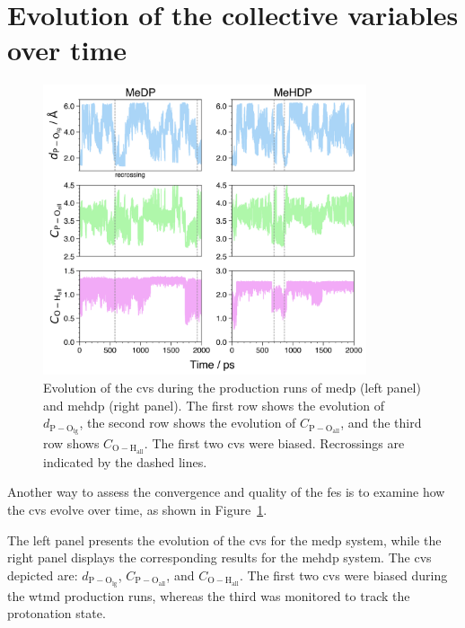 \section{Evolution of the collective variables over time}

\begin{figure}[t!]
    \centering
    \includegraphics[width=0.85\textwidth]{Figures/4_Results/results_300K_cv_evolution.png}
    \caption{Evolution of the \acp{cv} during the production runs of \ac{medp} (left panel) and \ac{mehdp} (right panel). The first row shows the evolution of $d_\mathrm{P-O_{\mathrm{lg}}}$, the second row shows the evolution of $C_\mathrm{P-O_{\mathrm{all}}}$, and the third row shows $C_\mathrm{O-H_{\mathrm{all}}}$. The first two \acp{cv} were biased. Recrossings are indicated by the dashed lines.}
    \label{fig:300k_cv_evolution}
\end{figure}

Another way to assess the convergence and quality of the \ac{fes} is to examine how the \acp{cv} evolve over time, as shown in Figure~\ref{fig:300k_cv_evolution}.

The left panel presents the evolution of the \acp{cv} for the \ac{medp} system, while the right panel displays the corresponding results for the \ac{mehdp} system. The \acp{cv} depicted are: $d_\mathrm{P-O_{\mathrm{lg}}}$, $C_\mathrm{P-O_{\mathrm{all}}}$, and $C_\mathrm{O-H_{\mathrm{all}}}$. The first two \acp{cv} were biased during the \ac{wtmd} production runs, whereas the third was monitored to track the protonation state.

